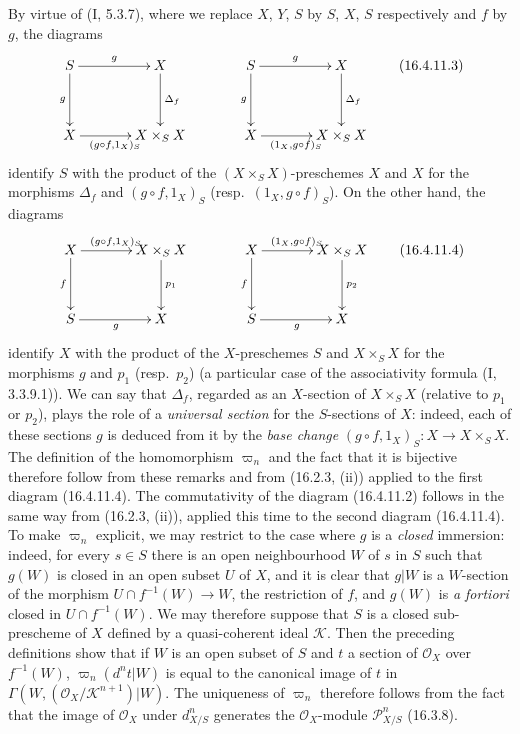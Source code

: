 By virtue of (I, 5.3.7), where we replace $X$, $Y$, $S$ by $S$, $X$, $S$
respectively and $f$ by $g$, the diagrams
\[
  \xymatrix@=3pc{
    S\ar[r]^-g\ar[d]_-g&X\ar[d]^-{\Delta_f}
      &S\ar[r]^-g\ar[d]_-g&X\ar[d]^-{\Delta_f}\\
    X\ar[r]_{(g\circ f,1_X)_S}&X\times_S X
      &X\ar[r]_{(1_X,g\circ f)_S}&X\times_S X
  }
  \tag{16.4.11.3}
  \label{IV.16.4.11.3}
\]
identify $S$ with the product of the $(X\times_S X)$-preschemes $X$ and $X$ for the
morphisms $\Delta_f$ and $(g\circ f,1_X)_S$ (resp.\ $(1_X,g\circ f)_S$).
On the other hand, the diagrams
\[
  \xymatrix@=3pc{
    X\ar[r]^{(g\circ f,1_X)_S}\ar[d]_-f&X\times_S X\ar[d]^-{p_1}
      &X\ar[r]^{(1_X,g\circ f)_S}\ar[d]_-f&X\times_S X\ar[d]^-{p_2}\\
    S\ar[r]_{g}&X&S\ar[r]_{g}&X
  }
  \tag{16.4.11.4}
  \label{IV.16.4.11.4}
\]
identify $X$ with the product of the $X$-preschemes $S$ and $X\times_S X$ for the
morphisms $g$ and $p_1$ (resp.\ $p_2$) (a particular case of the associativity
formula (I, 3.3.9.1)). We can say that $\Delta_f$, regarded as an
$X$-section of $X\times_S X$ (relative to $p_1$ or $p_2$), plays the role
of a \emph{universal section} for the $S$-sections of $X$: indeed, each of these
sections $g$ is deduced from it by the \emph{base change}
$(g\circ f,1_X)_S:X\to X\times_S X$. The definition of the homomorphism
$\varpi_n$ and the fact that it is bijective therefore follow from these
remarks and from (16.2.3, (ii)) applied to the first diagram (16.4.11.4). The
commutativity of the diagram (16.4.11.2) follows in the same way from
(16.2.3, (ii)), applied this time to the second diagram (16.4.11.4). To make
$\varpi_n$ explicit, we may restrict to the case where $g$ is a \emph{closed}
immersion: indeed, for every $s\in S$ there is an open neighbourhood $W$ of $s$
in $S$ such that $g(W)$ is closed in an open subset $U$ of $X$, and it is clear
that $g|W$ is a $W$-section of the morphism $U\cap f^{-1}(W)\to W$, the
restriction of $f$, and $g(W)$ is \emph{a fortiori} closed in
$U\cap f^{-1}(W)$. We may therefore suppose that $S$ is a closed
sub-prescheme of $X$ defined by a quasi-coherent ideal $\mathscr{K}$.
Then the preceding definitions show that if $W$ is an open subset of $S$ and
$t$ a section of $\mathcal{O}_X$ over $f^{-1}(W)$,
$\varpi_n(d^n t|W)$ is equal to the canonical image of $t$ in
$\Gamma(W,(\mathcal{O}_X/\mathscr{K}^{n+1})|W)$. The uniqueness of $\varpi_n$
therefore follows from the fact that the image of $\mathcal{O}_X$ under
$d_{X/S}^n$ generates the $\mathcal{O}_X$-module $\mathscr{P}_{X/S}^n$ (16.3.8).

